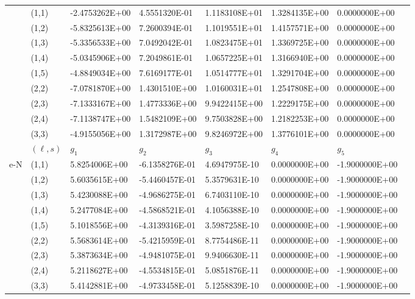 \documentclass{warpdoc}
\begin{document}
\begin{table*}[h]
\begin{center}
\begin{threeparttable}
\begin{tabular*}{\textwidth}{@{\extracolsep{\fill}}llllllll}
\cmidrule(lr{1em}){2-7}											
&	(1,1)	&	-2.4753262E+00	&	4.5551320E-01	&	1.1183108E+01	&	1.3284135E+00	&	0.0000000E+00	\\
&	(1,2)	&	-5.8325613E+00	&	7.2600394E-01	&	1.1019551E+01	&	1.4157571E+00	&	0.0000000E+00	\\
&	(1,3)	&	-5.3356533E+00	&	7.0492042E-01	&	1.0823475E+01	&	1.3369725E+00	&	0.0000000E+00	\\
&	(1,4)	&	-5.0345906E+00	&	7.2049861E-01	&	1.0657225E+01	&	1.3166940E+00	&	0.0000000E+00	\\
&	(1,5)	&	-4.8849034E+00	&	7.6169177E-01	&	1.0514777E+01	&	1.3291704E+00	&	0.0000000E+00	\\
&	(2,2)	&	-7.0781870E+00	&	1.4301510E+00	&	1.0160031E+01	&	1.2547808E+00	&	0.0000000E+00	\\
&	(2,3)	&	-7.1333167E+00	&	1.4773336E+00	&	9.9422415E+00	&	1.2229175E+00	&	0.0000000E+00	\\
&	(2,4)	&	-7.1138747E+00	&	1.5482109E+00	&	9.7503828E+00	&	1.2182253E+00	&	0.0000000E+00	\\
&	(3,3)	&	-4.9155056E+00	&	1.3172987E+00	&	9.8246972E+00	&	1.3776101E+00	&	0.0000000E+00	\\
      \midrule
 & $(\ell,s)$ & $g_1$ & $g_2$ & $g_3$ & $g_4$ & $g_5$ \\
\cmidrule(lr{1em}){2-7}
\multirow{19}{*}{e-N} &	(1,1)	&	5.8254006E+00	&	-6.1358276E-01	&	4.6947975E-10	&	0.0000000E+00	&	-1.9000000E+00	\\
&	(1,2)	&	5.6035615E+00	&	-5.4460457E-01	&	5.3579631E-10	&	0.0000000E+00	&	-1.9000000E+00	\\
&	(1,3)	&	5.4230088E+00	&	-4.9686275E-01	&	6.7403110E-10	&	0.0000000E+00	&	-1.9000000E+00	\\
&	(1,4)	&	5.2477084E+00	&	-4.5868521E-01	&	4.1056388E-10	&	0.0000000E+00	&	-1.9000000E+00	\\
&	(1,5)	&	5.1018556E+00	&	-4.3139316E-01	&	3.5987258E-10	&	0.0000000E+00	&	-1.9000000E+00	\\
&	(2,2)	&	5.5683614E+00	&	-5.4215959E-01	&	8.7754486E-11	&	0.0000000E+00	&	-1.9000000E+00	\\
&	(2,3)	&	5.3873634E+00	&	-4.9481075E-01	&	9.9406630E-11	&	0.0000000E+00	&	-1.9000000E+00	\\
&	(2,4)	&	5.2118627E+00	&	-4.5534815E-01	&	5.0851876E-11	&	0.0000000E+00	&	-1.9000000E+00	\\
&	(3,3)	&	5.4142881E+00	&	-4.9733458E-01	&	5.1258839E-10	&	0.0000000E+00	&	-1.9000000E+00	\\
\cmidrule(lr{1em}){2-7}

\end{tabular*}
\end{threeparttable}
\end{center}
\end{table*}
\end{document}

